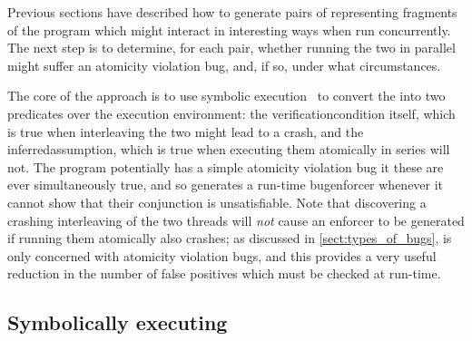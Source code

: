 Previous sections have described how to generate pairs of
{\StateMachines} representing fragments of the program which might
interact in interesting ways when run concurrently.  The next step is
to determine, for each pair, whether running the two {\StateMachines}
in parallel might suffer an atomicity violation bug, and, if so, under
what circumstances.

The core of the approach is to use symbolic execution~\cite{King1976}
to convert the {\StateMachines} into two predicates over the
{\StateMachine} execution environment: the \gls{verificationcondition}
itself, which is true when interleaving the two {\StateMachines} might
lead to a crash, and the \gls{inferredassumption}, which is true when
executing them atomically in series will not.  The program potentially
has a \gls{simple atomicity violation} bug it these are ever
simultaneously true, and so {\technique} generates a run-time
\gls{bugenforcer} whenever it cannot show that their conjunction is
unsatisfiable.  Note that discovering a crashing interleaving of the
two threads will \emph{not} cause an enforcer to be generated if
running them atomically also crashes; as discussed in
\autoref{sect:types_of_bugs}, {\technique} is only concerned with
atomicity violation bugs, and this provides a very useful reduction in
the number of false positives which must be checked at run-time.

\subsection{Symbolically executing {\StateMachines}}
\label{sect:derive:symbolic_execute}

